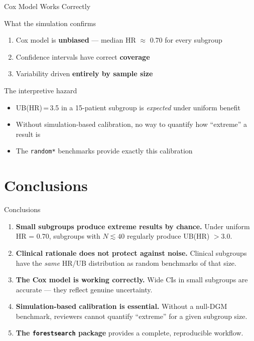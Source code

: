 \documentclass[
  11pt,
  ignorenonframetext,
  aspectratio=169,
]{beamer}
\begin{document}
\begin{frame}{Cox Model Works Correctly}
\protect{}\label{cox-model-works-correctly}
\begin{block}{What the simulation confirms}
\begin{enumerate}
\item Cox model is \textbf{unbiased} --- median HR $\approx$ 0.70 for every subgroup
\item Confidence intervals have correct \textbf{coverage}
\item Variability driven \textbf{entirely by sample size}
\end{enumerate}
\end{block}

\begin{alertblock}{The interpretive hazard}
\begin{itemize}
\item UB(HR)\,=\,3.5 in a 15-patient subgroup is \emph{expected} under uniform benefit
\item Without simulation-based calibration, no way to quantify how ``extreme'' a result is
\item The \texttt{random*} benchmarks provide exactly this calibration
\end{itemize}
\end{alertblock}
\end{frame}

\section{Conclusions}\label{conclusions}

\begin{frame}[fragile]{Conclusions}
\protect{}\label{conclusions-1}
\begin{enumerate}
\item
  \textbf{Small subgroups produce extreme results by chance.} Under
  uniform HR = 0.70, subgroups with \(N \lesssim 40\) regularly produce
  UB(HR) \(> 3.0\).
\item
  \textbf{Clinical rationale does not protect against noise.} Clinical
  subgroups have the \emph{same} HR/UB distribution as random benchmarks
  of that size.
\item
  \textbf{The Cox model is working correctly.} Wide CIs in small
  subgroups are accurate --- they reflect genuine uncertainty.
\item
  \textbf{Simulation-based calibration is essential.} Without a null-DGM
  benchmark, reviewers cannot quantify ``extreme'' for a given subgroup
  size.
\item
  \textbf{The \texttt{forestsearch} package} provides a complete,
  reproducible workflow.
\end{enumerate}
\end{frame}
\end{document}

